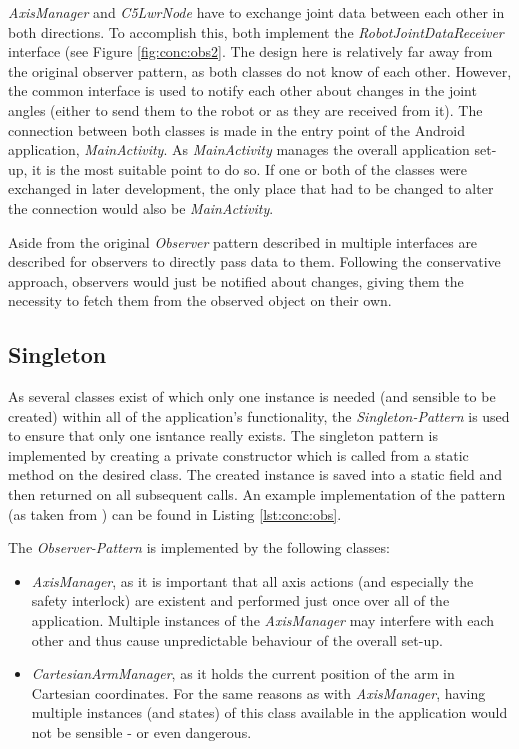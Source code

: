\textit{AxisManager} and \textit{C5LwrNode} have to exchange joint data between each other in both directions. To accomplish this, both implement the \textit{RobotJointDataReceiver} interface (see Figure \ref{fig:conc:obs2}. The design here is relatively far away from the original observer pattern, as both classes do not know of each other. However, the common interface is used to notify each other about changes in the joint angles (either to send them to the robot or as they are received from it). The connection between both classes is made in the entry point of the Android application, \textit{MainActivity}. As \textit{MainActivity} manages the overall application set-up, it is the most suitable point to do so. If one or both of the classes were exchanged in later development, the only place that had to be changed to alter the connection would also be \textit{MainActivity}.

Aside from the original \textit{Observer} pattern described in \cite{Eilebrecht2013} multiple interfaces are described for observers to directly pass data to them. Following the conservative approach, observers would just be notified about changes, giving them the necessity to fetch them from the observed object on their own.

\subsection{Singleton}

As several classes exist of which only one instance is needed (and sensible to be created) within all of the application's functionality, the \textit{Singleton-Pattern} is used to ensure that only one isntance really exists. The singleton pattern is implemented by creating a private constructor which is called from a static method on the desired class. The created instance is saved into a static field and then returned on all subsequent calls. An example implementation of the pattern (as taken from \cite{Eilebrecht2013}) can be found in Listing \ref{lst:conc:obs}.

The \textit{Observer-Pattern} is implemented by the following classes:
\begin{itemize}
	\item \textit{AxisManager}, as it is important that all axis actions (and especially the safety interlock) are existent and performed just once over all of the application. Multiple instances of the \textit{AxisManager} may interfere with each other and thus cause unpredictable behaviour of the overall set-up.
	\item \textit{CartesianArmManager}, as it holds the current position of the arm in Cartesian coordinates. For the same reasons as with \textit{AxisManager}, having multiple instances (and states) of this class available in the application would not be sensible - or even dangerous.
\end{itemize}

